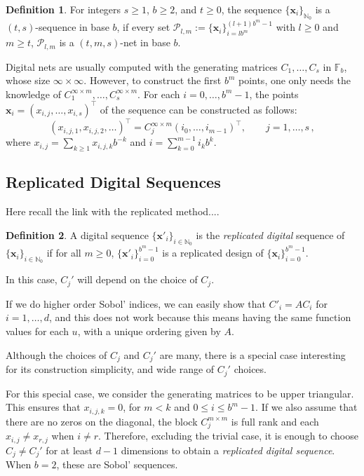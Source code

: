 \documentclass[]{elsarticle}
\theoremstyle{definition}
\newtheorem{defin}{Definition}
\newcommand{\bvec}[1]{\boldsymbol{#1}}
\newcommand{\vx}{\bvec{x}}
\begin{document}
\begin{defin}
For integers $s\geq 1$, $b\geq 2$, and $t\geq 0$, the sequence $\{\vx_i\}_{\mathbb{N}_0}$ is a $(t,s)$-sequence in base $b$, if every set $\mathcal{P}_{l,m}:=\{\vx_i\}_{i=lb^m}^{(l+1)b^m-1}$ with $l\geq 0$ and $m\geq t$, $\mathcal{P}_{l,m}$ is a $(t,m,s)$-net in base $b$.
\end{defin}

Digital nets are usually computed with the generating matrices $C_1,\dots,C_s$ in $\mathbb{F}_b$, whose size $\infty\times\infty$. However, to construct the first $b^m$ points, one only needs the knowledge of $C_1^{\infty\times m},\dots,C_s^{\infty\times m}$. For each $i=0,\dots,b^m-1$, the points $\vx_i = (x_{i,j},\dots,x_{i,s})^\intercal$ of the sequence can be constructed as follows:
\begin{equation}
(x_{i,j,1},x_{i,j,2},\dots)^\intercal = C_j^{\infty\times m}(i_{0},\dots,i_{m-1})^\intercal,\qquad j= 1,\dots,s\, ,
\end{equation}
where $x_{i,j} = \sum_{k \geq 1}x_{i,j,k}b^{-k}$ and $i = \sum_{k=0}^{m-1}i_kb^{k}$.

\subsection{Replicated Digital Sequences}
Here recall the link with the replicated method....
\begin{defin}
A digital sequence $\{{\vx'}_i\}_{i\in\mathbb{N}_0}$ is the \emph{replicated digital} sequence of $\{\vx_i\}_{i\in\mathbb{N}_0}$ if for all $m\geq 0$, $\{{\vx'}_i\}_{i=0}^{b^m-1}$ is a replicated design of $\{{\vx}_i\}_{i=0}^{b^m-1}$.
\end{defin}
In this case, $C_j'$ will depend on the choice of $C_j$.

If we do higher order Sobol' indices, we can easily show that $C'_{i}=AC_{i}$ for $i = 1,\dots,d$, and this does not work because this means having the same function values for each $u$, with a unique ordering given by $A$.
 
Although the choices of $C_j$ and $C_j'$ are many, there is a special case interesting for its construction simplicity, and wide range of $C_j'$ choices.

For this special case, we consider the generating matrices to be upper triangular. This ensures that $x_{i,j,k}=0$, for $m<k$ and $0 \leq i \leq b^m-1$. If we also assume that there are no zeros on the diagonal, the block $C_j^{m\times m}$ is full rank and each $x_{i,j}\neq x_{r,j}$ when $i\neq r$. Therefore, excluding the trivial case, it is enough to choose $C_j\neq C_j'$ for at least $d-1$ dimensions to obtain a \emph{replicated digital sequence}. When $b=2$, these are Sobol' sequences.
\end{document}
